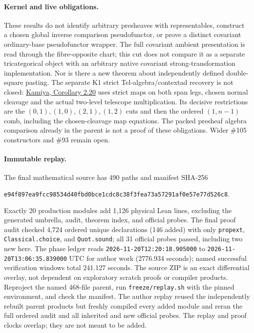 \documentclass[11pt]{article}
\newcommand{\m}[1]{\texttt{#1}}
\begin{document}
\paragraph{Kernel and live obligations.}
These results do not identify arbitrary presheaves with representables,
construct a chosen global inverse comparison pseudofunctor, or prove
a distinct covariant ordinary-base pseudofunctor wrapper. The full
covariant ambient presentation is read through the fibre-opposite chart;
this cut does not compare it as a separate tricategorical object with an
arbitrary native covariant strong-transformation implementation. Nor is
there a new theorem about independently defined double-square pasting.
The separate K1 strict Tel-algebra/contextad recovery is not closed:
\href{https://hexagonmath.org/pdf/2610.00302v1}{Kamiya, Corollary 2.20}
uses strict maps on both span legs, chosen normal cleavage and the actual
two-level telescope multiplication. Its decisive restrictions are the
$(0,1),(1,0),(2,1),(1,2)$ cuts and then the ordered $(1,n-1)$ comb, including
the chosen-cleavage map equations. The packed presheaf algebra comparison
already in the parent is not a proof of these obligations. Wider \#105
constructors and \#93 remain open.

\paragraph{Immutable replay.}
The final mathematical source has 490 paths and manifest SHA-256
\begin{center}\small\m{e94f897ea9fcc98534d40fbd0bce1cdc8c38f3fea73a57291af0e57e77d526c8}.\end{center}
Exactly 20 production modules add 1,126 physical Lean lines, excluding
the generated umbrella, audit, theorem index, and official probes.
The final proof audit checked 4,724 ordered unique declarations (146
added) with only \m{propext}, \m{Classical.choice}, and \m{Quot.sound};
all 31 official probes passed, including two new here.
The phase ledger reads \m{2026-11-20T12:20:18.905000} to
\m{2026-11-20T13:06:35.839000} UTC for author work
(2776.934 seconds); named successful verification
windows total 241.127 seconds.
The source ZIP is an exact differential overlay, not dependent on
exploratory scratch proofs or compiler products. Reproject the named
468-file parent, run \m{freeze/replay.sh} with the pinned environment,
and check the manifest. The author replay reused the independently rebuilt
parent products but freshly compiled every added module and reran the full
ordered audit and all inherited and new official probes. The replay and
proof clocks overlap; they are not meant to be added.
\end{document}

